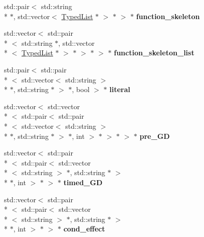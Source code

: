 \begin{DoxyCompactItemize}
\item 
\hypertarget{unionParserBase_1_1STYPE_____ae6657530c88b67602d9c3d152c9e08bb}{std\+::pair$<$ std\+::string \\*
$\ast$, std\+::vector$<$ \hyperlink{classTypedList}{Typed\+List} $\ast$ $>$ $\ast$ $>$ $\ast$ {\bfseries function\+\_\+skeleton}}\label{unionParserBase_1_1STYPE_____ae6657530c88b67602d9c3d152c9e08bb}

\item 
\hypertarget{unionParserBase_1_1STYPE_____ac3322fdc19571ded0354accbb53384cb}{std\+::vector$<$ std\+::pair\\*
$<$ std\+::string $\ast$, std\+::vector\\*
$<$ \hyperlink{classTypedList}{Typed\+List} $\ast$ $>$ $\ast$ $>$ $\ast$ $>$ $\ast$ {\bfseries function\+\_\+skeleton\+\_\+list}}\label{unionParserBase_1_1STYPE_____ac3322fdc19571ded0354accbb53384cb}

\item 
\hypertarget{unionParserBase_1_1STYPE_____a70c36b4ca4cb9695e912495b0a276b63}{std\+::pair$<$ std\+::pair\\*
$<$ std\+::vector$<$ std\+::string $>$\\*
 $\ast$, std\+::string $\ast$ $>$ $\ast$, bool $>$ $\ast$ {\bfseries literal}}\label{unionParserBase_1_1STYPE_____a70c36b4ca4cb9695e912495b0a276b63}

\item 
\hypertarget{unionParserBase_1_1STYPE_____a4b65f160ac88f1f44a1e9c4a892b3612}{std\+::vector$<$ std\+::vector\\*
$<$ std\+::pair$<$ std\+::pair\\*
$<$ std\+::vector$<$ std\+::string $>$\\*
 $\ast$, std\+::string $\ast$ $>$ $\ast$, int $>$ $\ast$ $>$ $\ast$ $>$ $\ast$ {\bfseries pre\+\_\+\+G\+D}}\label{unionParserBase_1_1STYPE_____a4b65f160ac88f1f44a1e9c4a892b3612}

\item 
\hypertarget{unionParserBase_1_1STYPE_____adf129a6213d541035b873cff52d26e63}{std\+::vector$<$ std\+::pair\\*
$<$ std\+::pair$<$ std\+::vector\\*
$<$ std\+::string $>$ $\ast$, std\+::string $\ast$ $>$\\*
 $\ast$, int $>$ $\ast$ $>$ $\ast$ {\bfseries timed\+\_\+\+G\+D}}\label{unionParserBase_1_1STYPE_____adf129a6213d541035b873cff52d26e63}

\item 
\hypertarget{unionParserBase_1_1STYPE_____a79e1c1d70b78c5bd090118c2fbf46781}{std\+::vector$<$ std\+::pair\\*
$<$ std\+::pair$<$ std\+::vector\\*
$<$ std\+::string $>$ $\ast$, std\+::string $\ast$ $>$\\*
 $\ast$, int $>$ $\ast$ $>$ $\ast$ {\bfseries cond\+\_\+effect}}\label{unionParserBase_1_1STYPE_____a79e1c1d70b78c5bd090118c2fbf46781}


\end{DoxyCompactItemize}
